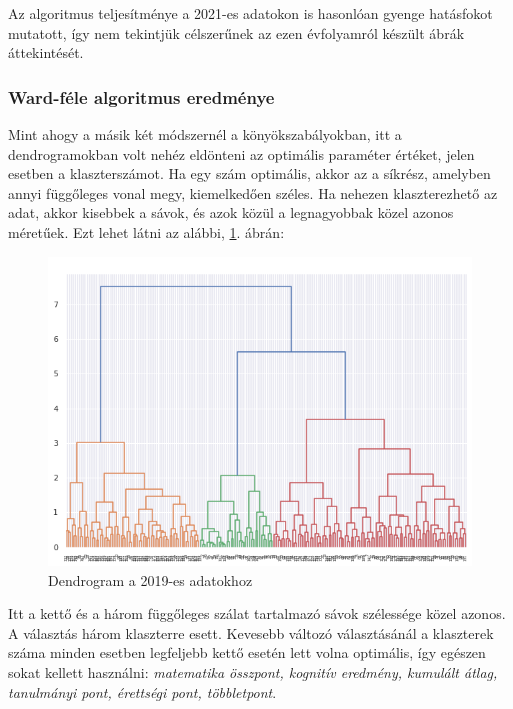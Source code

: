 \documentclass[12pt]{article}
\begin{document}
Az algoritmus teljesítménye a 2021-es adatokon is hasonlóan gyenge hatásfokot mutatott, így nem tekintjük célszerűnek az ezen évfolyamról készült ábrák áttekintését.

\subsubsection{Ward-féle algoritmus eredménye}

Mint ahogy a másik két módszernél a könyökszabályokban, itt a dendrogramokban volt nehéz eldönteni az optimális paraméter értéket, jelen esetben a klaszterszámot. Ha egy szám optimális, akkor az a síkrész, amelyben annyi függőleges vonal megy, kiemelkedően széles. Ha nehezen klaszterezhető az adat, akkor kisebbek a sávok, és azok közül a legnagyobbak közel azonos méretűek. Ezt lehet látni az alábbi, \ref{fig:dendrogram}. ábrán:

\begin{figure}[H]
\centering
\includegraphics[width = \textwidth]{kepek/dendrogram.png}
\caption{Dendrogram a 2019-es adatokhoz}
\label{fig:dendrogram}
\end{figure}

Itt a kettő és a három függőleges szálat tartalmazó sávok szélessége közel azonos. A választás három klaszterre esett. Kevesebb változó választásánál a klaszterek száma minden esetben legfeljebb kettő esetén lett volna optimális, így egészen sokat kellett használni: \textit{matematika összpont, kognitív eredmény, kumulált átlag, tanulmányi pont, érettségi pont, többletpont}.
\end{document}
